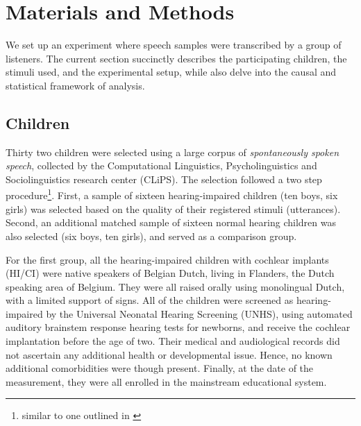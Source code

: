 \section{Materials and Methods} \label{S:materials_methods}
%
We set up an experiment where speech samples were transcribed by a group of listeners. The current section succinctly describes the participating children, the stimuli used, and the experimental setup, while also delve into the causal and statistical framework of analysis.
%
%
\subsection{Children} \label{sS:children}
%
Thirty two children were selected using a large corpus of \textit{spontaneously spoken speech}, collected by the Computational Linguistics, Psycholinguistics and Sociolinguistics research center (CLiPS). The selection followed a two step procedure\footnote{similar to one outlined in \citet{Faes_et_al_2021}}. First, a sample of sixteen hearing-impaired children (ten boys, six girls) was selected based on the quality of their registered stimuli (utterances). Second, an additional matched sample of sixteen normal hearing children was also selected (six boys, ten girls), and served as a comparison group.
%
\begin{comment}
	Similar designs were used by \citet{Boonen_et_al_2020} and \citet{Faes_et_al_2021}. However, in the former case the number of samples were low, while in the latter, the design was unbalanced and not conducive to appropriate inferences from the pairwise comparisons.
\end{comment}

For the first group, all the hearing-impaired children with cochlear implants (HI/CI) were native speakers of Belgian Dutch, living in Flanders, the Dutch speaking area of Belgium. They were all raised orally using monolingual Dutch, with a limited support of signs. All of the children were screened as hearing-impaired by the Universal Neonatal Hearing Screening (UNHS), using automated auditory brainstem response hearing tests for newborns, and receive the cochlear implantation before the age of two. Their medical and audiological records did not ascertain any additional health or developmental issue. Hence, no known additional comorbidities were though present. Finally, at the date of the measurement, they were all enrolled in the mainstream educational system.

